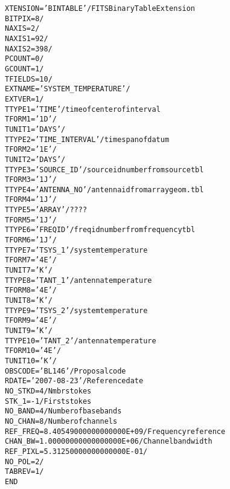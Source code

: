 \documentclass[twoside]{article}
\begin{document}
\begin{alltt}
XTENSION= 'BINTABLE'           / FITS Binary Table Extension
BITPIX  =                    8 /
NAXIS   =                    2 /
NAXIS1  =                   92 /
NAXIS2  =                  398 /
PCOUNT  =                    0 /
GCOUNT  =                    1 /
TFIELDS =                   10 /
EXTNAME = 'SYSTEM_TEMPERATURE' /
EXTVER  =                    1 /
TTYPE1  = 'TIME    '           / time of center of interval
TFORM1  = '1D      '           /
TUNIT1  = 'DAYS    '           /
TTYPE2  = 'TIME_INTERVAL'      / time span of datum
TFORM2  = '1E      '           /
TUNIT2  = 'DAYS    '           /
TTYPE3  = 'SOURCE_ID'          / source id number from source tbl
TFORM3  = '1J      '           /
TTYPE4  = 'ANTENNA_NO'         / antenna id from array geom. tbl
TFORM4  = '1J      '           /
TTYPE5  = 'ARRAY   '           / ????
TFORM5  = '1J      '           /
TTYPE6  = 'FREQID  '           / freq id number from frequency tbl
TFORM6  = '1J      '           /
TTYPE7  = 'TSYS_1  '           / system temperature
TFORM7  = '4E      '           /
TUNIT7  = 'K       '           /
TTYPE8  = 'TANT_1  '           / antenna temperature
TFORM8  = '4E      '           /
TUNIT8  = 'K       '           /
TTYPE9  = 'TSYS_2  '           / system temperature
TFORM9  = '4E      '           /
TUNIT9  = 'K       '           /
TTYPE10 = 'TANT_2  '           / antenna temperature
TFORM10 = '4E      '           /
TUNIT10 = 'K       '           /
OBSCODE = 'BL146   '           / Proposal code
RDATE   = '2007-08-23'         / Reference date
NO_STKD =                    4 / Nmbr stokes
STK_1   =                   -1 / First stokes
NO_BAND =                    4 / Number of basebands
NO_CHAN =                    8 / Number of channels
REF_FREQ=   8.40549000000000000E+09 / Frequency reference
CHAN_BW =   1.00000000000000000E+06 / Channel bandwidth
REF_PIXL=   5.31250000000000000E-01 /
NO_POL  =                    2 /
TABREV  =                    1 /
END
\end{alltt}
\end{document}
